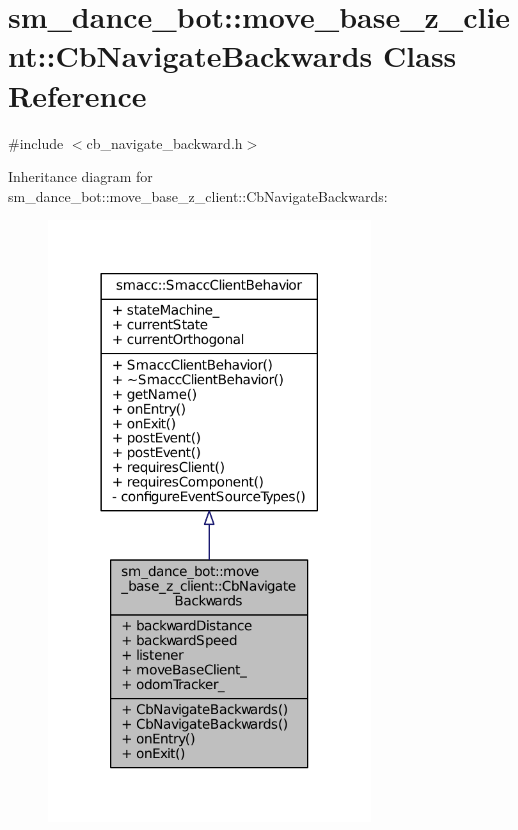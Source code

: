 \hypertarget{classsm__dance__bot_1_1move__base__z__client_1_1CbNavigateBackwards}{}\section{sm\+\_\+dance\+\_\+bot\+:\+:move\+\_\+base\+\_\+z\+\_\+client\+:\+:Cb\+Navigate\+Backwards Class Reference}
\label{classsm__dance__bot_1_1move__base__z__client_1_1CbNavigateBackwards}


{\ttfamily \#include $<$cb\+\_\+navigate\+\_\+backward.\+h$>$}



Inheritance diagram for sm\+\_\+dance\+\_\+bot\+:\+:move\+\_\+base\+\_\+z\+\_\+client\+:\+:Cb\+Navigate\+Backwards\+:
\nopagebreak
\begin{figure}[H]
\begin{center}
\leavevmode
\includegraphics[width=242pt]{classsm__dance__bot_1_1move__base__z__client_1_1CbNavigateBackwards__inherit__graph}
\end{center}
\end{figure}


